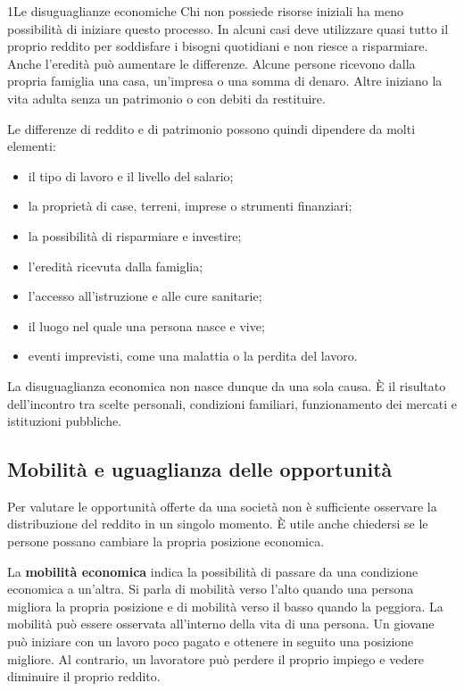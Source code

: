\begin{lettura}{1}{Le disuguaglianze economiche}
Chi non possiede risorse iniziali ha meno possibilità di iniziare questo processo. In alcuni casi deve utilizzare quasi tutto il proprio reddito per soddisfare i bisogni quotidiani e non riesce a risparmiare. Anche l'eredità può aumentare le differenze. Alcune persone ricevono dalla propria famiglia una casa, un'impresa o una somma di denaro. Altre iniziano la vita adulta senza un patrimonio o con debiti da restituire.

Le differenze di reddito e di patrimonio possono quindi dipendere da molti elementi:
\begin{itemize}
\item il tipo di lavoro e il livello del salario;
\item la proprietà di case, terreni, imprese o strumenti finanziari;
\item la possibilità di risparmiare e investire;
\item l'eredità ricevuta dalla famiglia;
\item l'accesso all'istruzione e alle cure sanitarie;
\item il luogo nel quale una persona nasce e vive;
\item eventi imprevisti, come una malattia o la perdita del lavoro.
\end{itemize}

La disuguaglianza economica non nasce dunque da una sola causa. È il risultato dell'incontro tra scelte personali, condizioni familiari, funzionamento dei mercati e istituzioni pubbliche.

\subsection*{Mobilità e uguaglianza delle opportunità}
Per valutare le opportunità offerte da una società non è sufficiente osservare la distribuzione del reddito in un singolo momento. È utile anche chiedersi se le persone possano cambiare la propria posizione economica.

La \textbf{mobilità economica} indica la possibilità di passare da una condizione economica a un'altra. Si parla di mobilità verso l'alto quando una persona migliora la propria posizione e di mobilità verso il basso quando la peggiora. La mobilità può essere osservata all'interno della vita di una persona. Un giovane può iniziare con un lavoro poco pagato e ottenere in seguito una posizione migliore. Al contrario, un lavoratore può perdere il proprio impiego e vedere diminuire il proprio reddito.


\end{lettura}
